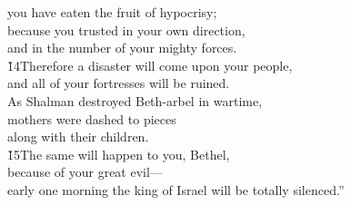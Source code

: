 \begin{poetry}
\poemlll       you have eaten the fruit of hypocrisy; \\
\poeml because you trusted in your own direction, \\
\poemll    and in the number of your mighty forces. \\
\poeml \v{14}Therefore a disaster will come upon your people, \\
\poemll    and all of your fortresses will be ruined. \\
\poeml As Shalman destroyed Beth-arbel in wartime, \\
\poemll    mothers were dashed to pieces \\
\poemlll       along with their children. \\
\poeml \v{15}The same will happen to you, Bethel, \\
\poemll    because of your great evil--- \\
\poemlll       early one morning the king of Israel will be totally silenced.''
\end{poetry}

